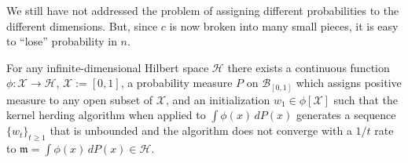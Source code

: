 \documentclass[AHL,Unicode,longabstracts,published]{cedram}
\theoremstyle{remark}
\newcommand{\X}{\mathcal{X}}
\newcommand{\cH}{\mathcal{H}}
\newcommand{\scB}{\mathscr{B}}
\newcommand{\mean}{\mathfrak{m}}
\begin{document}
We still have not addressed the problem of assigning different probabilities to the different dimensions. But, since $c$ is now broken into many small pieces, it is easy to ``lose'' probability in $n$.



\begin{prop}\label{Thm:CounterExample}
For any infinite-dimensional Hilbert space $\cH$ there exists a continuous function $\phi:\X \rightarrow \cH$, $\X:=[0,1]$, a probability measure $P$ on $\scB_{[0,1]}$ which assigns positive measure to any open subset of $\X$, and an initialization $w_1 \in \phi[\X]$ such that the kernel herding algorithm when applied to $\int \phi(x) \,dP(x)$ generates a sequence $\{w_t\}_{t\geq 1}$ that is unbounded and the algorithm does not converge with a $1/t$ rate to $\mean = \int \phi(x) \,dP(x) \in \cH$.
\end{prop}
\end{document}

